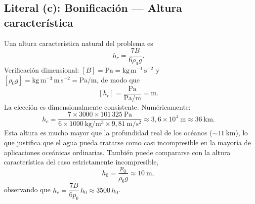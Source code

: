 \documentclass[a4paper]{article}
\begin{document}
\subsection{Literal (c): Bonificación --- Altura característica}

Una altura característica natural del problema es
$$
h_{c}=\frac{7B}{6\rho_{0}g}.
$$
Verificación dimensional: $[B]=\mathrm{Pa}=\mathrm{kg\,m^{-1}\,s^{-2}}$ y $[\rho_{0}g]=\mathrm{kg\,m^{-3}\,m\,s^{-2}}=\mathrm{Pa/m}$, de modo que
$$
[h_{c}]=\frac{\mathrm{Pa}}{\mathrm{Pa/m}}=\mathrm{m}.
$$
La elección es dimensionalmente consistente. Numéricamente:
$$
h_{c}=\frac{7\times 3000\times 101\,325\ \mathrm{Pa}}{6\times 1000\ \mathrm{kg/m^{3}}\times 9{,}81\ \mathrm{m/s^{2}}}
\approx 3{,}6\times 10^{4}\ \mathrm{m}\approx 36\ \mathrm{km}.
$$
Esta altura es mucho mayor que la profundidad real de los océanos ($\sim 11\ \mathrm{km}$), lo que justifica que el agua pueda tratarse como casi incompresible en la mayoría de aplicaciones oceánicas ordinarias. También puede compararse con la altura característica del caso estrictamente incompresible,
$$
h_{0}=\frac{p_{0}}{\rho_{0}g}\approx 10\ \mathrm{m},
$$
observando que $h_{c}=\dfrac{7B}{6p_{0}}\,h_{0}\approx 3500\,h_{0}$.
\end{document}

